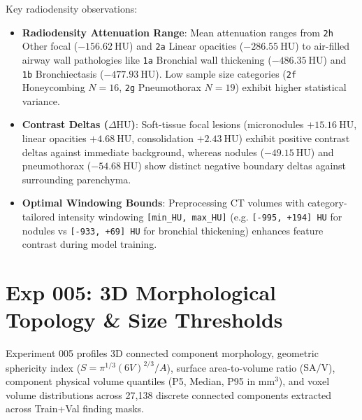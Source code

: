 \documentclass[11pt,a4paper]{article}
\begin{document}
Key radiodensity observations:
\begin{itemize}
    \item \textbf{Radiodensity Attenuation Range}: Mean attenuation ranges from \texttt{2h} Other focal ($-156.62~\text{HU}$) and \texttt{2a} Linear opacities ($-286.55~\text{HU}$) to air-filled airway wall pathologies like \texttt{1a} Bronchial wall thickening ($-486.35~\text{HU}$) and \texttt{1b} Bronchiectasis ($-477.93~\text{HU}$). Low sample size categories (\texttt{2f} Honeycombing $N=16$, \texttt{2g} Pneumothorax $N=19$) exhibit higher statistical variance.
    \item \textbf{Contrast Deltas ($\Delta \text{HU}$)}: Soft-tissue focal lesions (micronodules $+15.16~\text{HU}$, linear opacities $+4.68~\text{HU}$, consolidation $+2.43~\text{HU}$) exhibit positive contrast deltas against immediate background, whereas nodules ($-49.15~\text{HU}$) and pneumothorax ($-54.68~\text{HU}$) show distinct negative boundary deltas against surrounding parenchyma.
    \item \textbf{Optimal Windowing Bounds}: Preprocessing CT volumes with category-tailored intensity windowing \texttt{[min\_HU, max\_HU]} (e.g. \texttt{[-995, +194] HU} for nodules vs \texttt{[-933, +69] HU} for bronchial thickening) enhances feature contrast during model training.
\end{itemize}

\section{Exp 005: 3D Morphological Topology \& Size Thresholds}

Experiment 005 profiles 3D connected component morphology, geometric sphericity index ($S = \pi^{1/3}(6V)^{2/3} / A$), surface area-to-volume ratio ($\text{SA}/\text{V}$), component physical volume quantiles (P5, Median, P95 in $\text{mm}^3$), and voxel volume distributions across 27,138 discrete connected components extracted across Train+Val finding masks.
\end{document}
